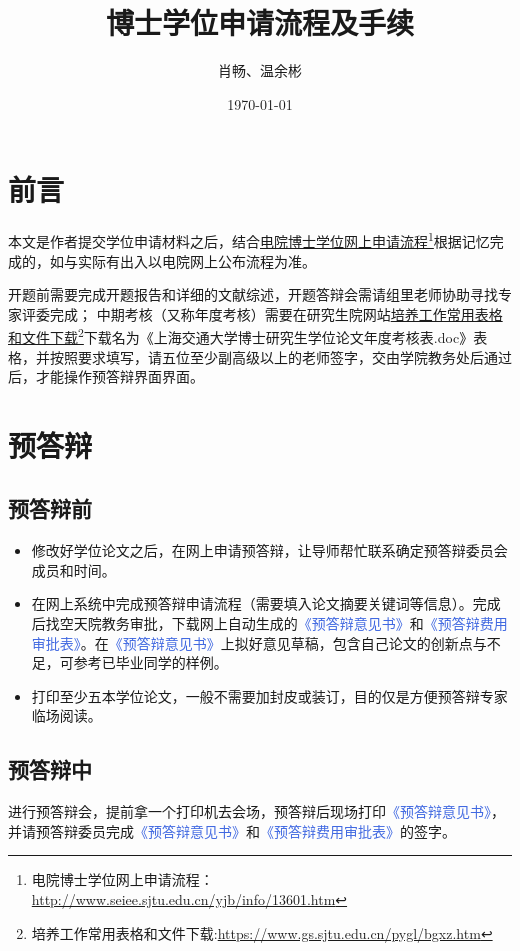 \documentclass[a4paper, 12pt]{ctexart}
\title{博士学位申请流程及手续}
\author{肖畅、温余彬}
\date{\today}
\newcommand{\form}[1]{\textcolor{RoyalBlue}{《#1》}}
\begin{document}
\maketitle
\tableofcontents

\section{前言}
本文是作者提交学位申请材料之后，结合\href{http://www.seiee.sjtu.edu.cn/yjb/info/13601.htm}{电院博士学位网上申请流程}\footnote{电院博士学位网上申请流程：\url{http://www.seiee.sjtu.edu.cn/yjb/info/13601.htm}}根据记忆完成的，如与实际有出入以电院网上公布流程为准。

开题前需要完成开题报告和详细的文献综述，开题答辩会需请组里老师协助寻找专家评委完成；%
中期考核（又称年度考核）需要在研究生院网站\href{https://www.gs.sjtu.edu.cn/pygl/bgxz.htm}{培养工作常用表格和文件下载}\footnote{培养工作常用表格和文件下载:\url{https://www.gs.sjtu.edu.cn/pygl/bgxz.htm}}下载名为《上海交通大学博士研究生学位论文年度考核表.doc》表格，并按照要求填写，请五位至少副高级以上的老师签字，交由学院教务处后通过后，才能操作预答辩界面界面。

\section{预答辩}
\subsection{预答辩前}
\begin{itemize}
    \item 修改好学位论文之后，在网上申请预答辩，让导师帮忙联系确定预答辩委员会成员和时间。
    \item 在网上系统中完成预答辩申请流程（需要填入论文摘要关键词等信息）。完成后找空天院教务审批，下载网上自动生成的\form{预答辩意见书}和\form{预答辩费用审批表}。在\form{预答辩意见书}上拟好意见草稿，包含自己论文的创新点与不足，可参考已毕业同学的样例。
    \item 打印至少五本学位论文，一般不需要加封皮或装订，目的仅是方便预答辩专家临场阅读。
\end{itemize}
\subsection{预答辩中}
进行预答辩会，提前拿一个打印机去会场，预答辩后现场打印\form{预答辩意见书}，并请预答辩委员完成\form{预答辩意见书}和\form{预答辩费用审批表}的签字。
\end{document}
